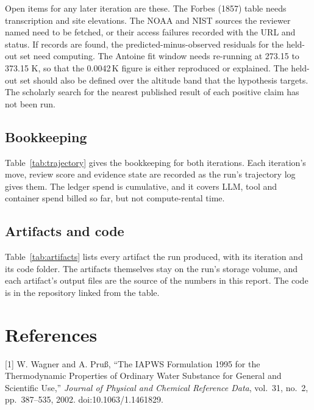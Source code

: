\documentclass[11pt,letterpaper]{article}
\begin{document}
Open items for any later iteration are these. The Forbes (1857) table needs transcription and site elevations. The NOAA and NIST sources the reviewer named need to be fetched, or their access failures recorded with the URL and status. If records are found, the predicted-minus-observed residuals for the held-out set need computing. The Antoine fit window needs re-running at 273.15 to 373.15 K, so that the 0.0042\,K figure is either reproduced or explained. The held-out set should also be defined over the altitude band that the hypothesis targets. The scholarly search for the nearest published result of each positive claim has not been run.

\subsection{Bookkeeping}

Table~\ref{tab:trajectory} gives the bookkeeping for both iterations. Each iteration's move, review score and evidence state are recorded as the run's trajectory log gives them. The ledger spend is cumulative, and it covers LLM, tool and container spend billed so far, but not compute-rental time.



\subsection{Artifacts and code}

Table~\ref{tab:artifacts} lists every artifact the run produced, with its iteration and its code folder. The artifacts themselves stay on the run's storage volume, and each artifact's output files are the source of the numbers in this report. The code is in the repository linked from the table.



\section*{References}

[1] W. Wagner and A. Pru\ss{}, ``The IAPWS Formulation 1995 for the Thermodynamic Properties of Ordinary Water Substance for General and Scientific Use,'' \emph{Journal of Physical and Chemical Reference Data}, vol.~31, no.~2, pp.~387--535, 2002. doi:10.1063/1.1461829.
\end{document}

